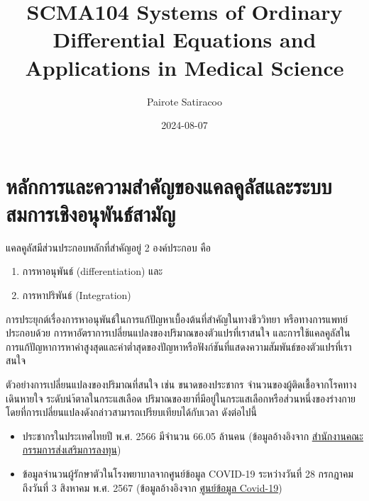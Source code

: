 \documentclass[landscape, 20pt]{extarticle}
\title{SCMA104 Systems of Ordinary Differential Equations and Applications in Medical Science}
\author{Pairote Satiracoo}
\date{2024-08-07}
\theoremstyle{definition}
\theoremstyle{remark}
\begin{document}
\maketitle


\section{หลักการและความสำคัญของแคลคูลัสและระบบสมการเชิงอนุพันธ์สามัญ}\label{uxe2buxe25uxe01uxe01uxe32uxe23uxe41uxe25uxe30uxe04uxe27uxe32uxe21uxe2auxe33uxe04uxe0duxe02uxe2duxe07uxe41uxe04uxe25uxe04uxe25uxe2auxe41uxe25uxe30uxe23uxe30uxe1auxe1auxe2auxe21uxe01uxe32uxe23uxe40uxe0auxe07uxe2duxe19uxe1euxe19uxe18uxe2auxe32uxe21uxe0d}

แคลคูลัสมีส่วนประกอบหลักที่สำคัญอยู่ 2 องค์ประกอบ คือ

\begin{enumerate}
\def\labelenumi{\arabic{enumi}.}
\item
  การหาอนุพันธ์ (differentiation) และ
\item
  การหาปริพันธ์ (Integration)
\end{enumerate}

การประยุกต์เรื่องการหาอนุพันธ์ในการแก้ปัญหาเบื้องต้นที่สำคัญในทางชีววิทยา หรือทางการแพทย์ ประกอบด้วย การหาอัตราการเปลี่ยนแปลงของปริมาณของตัวแปรที่เราสนใจ และการใช้แคลคูลัสในการแก้ปัญหาการหาค่าสูงสุดและค่าต่ำสุดของปัญหาหรือฟังก์ชันที่แสดงความสัมพันธ์ของตัวแปรที่เราสนใจ

ตัวอย่างการเปลี่ยนแปลงของปริมาณที่สนใจ เช่น ขนาดของประชากร จำนวนของผู้ติดเชื้อจากโรคทางเดินหายใจ ระดับนำ้ตาลในกระแสเลือด ปริมาณของยาที่มีอยู่ในกระแสเลือกหรือส่วนหนึ่งของร่างกาย โดยที่การเปลี่ยนแปลงดังกล่าวสามารถเปรียบเทียบได้กับเวลา ดังต่อไปนี้

\begin{itemize}
\item
  ประชากรในประเทศไทยปี พ.ศ. 2566 มีจำนวน 66.05 ล้านคน (ข้อมูลอ้างอิงจาก \href{https://www.boi.go.th/index.php?page=demographic}{สำนักงานคณะกรรมการส่งเสริมการลงทุน})
\item
  ข้อมูลจำนวนผู้รักษาตัวในโรงพยาบาลจากศูนย์ข้อมูล COVID-19 ระหว่างวันที่ 28 กรกฎาคม ถึงวันที่ 3 สิงหาคม พ.ศ. 2567 (ข้อมูลอ้างอิงจาก \href{https://www.facebook.com/informationcovid19?locale=th_TH}{ศูนย์ข้อมูล Covid-19})
\end{itemize}
\end{document}
